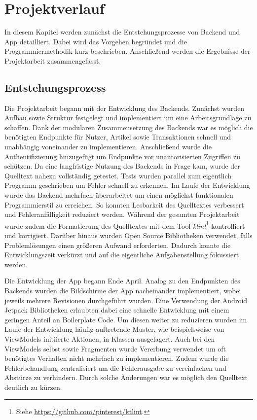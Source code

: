 \chapter{Projektverlauf}
\label{ch:methodologies}
In diesem Kapitel werden zunächst die Entstehungsprozesse von Backend und App detailliert.
Dabei wird das Vorgehen begründet und die Programmiermethodik kurz beschrieben.
Anschließend werden die Ergebnisse der Projektarbeit zusammengefasst.

\section{Entstehungsprozess}
\label{sec:methodologies:process}
Die Projektarbeit begann mit der Entwicklung des Backends.
Zunächst wurden Aufbau sowie Struktur festgelegt und implementiert um eine Arbeitsgrundlage zu schaffen.
Dank der modularen Zusammensetzung des Backends war es möglich die benötigten Endpunkte für Nutzer, Artikel sowie Transaktionen schnell und unabhängig voneinander zu implementieren.
Anschließend wurde die Authentifizierung hinzugefügt um Endpunkte vor unautorisierten Zugriffen zu schützen.
Da eine langfristige Nutzung des Backends in Frage kam, wurde der Quelltext nahezu vollständig getestet.
Tests wurden parallel zum eigentlich Programm geschrieben um Fehler schnell zu erkennen.
Im Laufe der Entwicklung wurde das Backend mehrfach überarbeitet um einen möglichst funktionalen Programmierstil zu erreichen.
So konnten Lesbarkeit des Quelltextes verbessert und Fehleranfälligkeit reduziert werden.
Während der gesamten Projektarbeit wurde zudem die Formatierung des Quelltextes mit dem Tool \textit{klint}\footnote{Siehe \url{https://github.com/pinterest/ktlint}.} kontrolliert und korrigiert.
Darüber hinaus wurden Open Source Bibliotheken verwendet, falls Problemlösungen einen größeren Aufwand erforderten.
Dadurch konnte die Entwicklungszeit verkürzt und auf die eigentliche Aufgabenstellung fokussiert werden.

Die Entwicklung der App begann Ende April.
Analog zu den Endpunkten des Backends wurden die Bildschirme der App nacheinander implementiert, wobei jeweils mehrere Revisionen durchgeführt wurden.
Eine Verwendung der Android Jetpack Bibliotheken erlaubten dabei eine schnelle Entwicklung mit einem geringen Anteil an Boilerplate Code.
Um diesen weiter zu reduzieren wurden im Laufe der Entwicklung häufig auftretende Muster, wie beispielsweise von ViewModels initiierte Aktionen, in Klassen ausgelagert.
Auch bei den ViewModels selbst sowie Fragmenten wurde Vererbung verwendet um oft benötigtes Verhalten nicht mehrfach zu implementieren.
Zudem wurde die Fehlerbehandlung zentralisiert um die Fehlerausgabe zu vereinfachen und Abstürze zu verhindern.
Durch solche Änderungen war es möglich den Quelltext deutlich zu kürzen.

